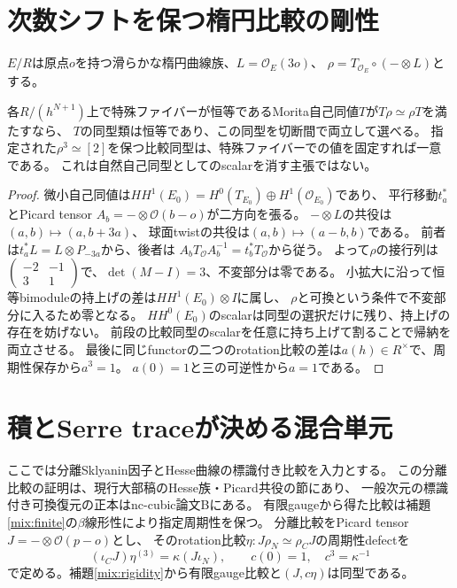 \section{次数シフトを保つ楕円比較の剛性}
$E/R$は原点$o$を持つ滑らかな楕円曲線族、$L=\mathcal O_E(3o)$、
$\rho=T_{\mathcal O_E}\circ(-\otimes L)$とする。
\begin{lemma}\label{mix:rigidity}
各$R/(h^{N+1})$上で特殊ファイバーが恒等であるMorita自己同値$T$が$T\rho\simeq\rho T$を満たすなら、
$T$の同型類は恒等であり、この同型を切断間で両立して選べる。
指定された$\rho^3\simeq[2]$を保つ比較同型は、特殊ファイバーでの値を固定すれば一意である。
これは自然自己同型としてのscalarを消す主張ではない。
\end{lemma}
\begin{proof}
微小自己同値は$HH^1(E_0)=H^0(T_{E_0})\oplus H^1(\mathcal O_{E_0})$であり、
平行移動$t_a^*$とPicard tensor $A_b=-\otimes\mathcal O(b-o)$が二方向を張る。
$-\otimes L$の共役は$(a,b)\mapsto(a,b+3a)$、
球面twistの共役は$(a,b)\mapsto(a-b,b)$である。
前者は$t_a^*L=L\otimes P_{-3a}$から、後者は
$A_bT_{\mathcal O}A_b^{-1}=t_b^*T_{\mathcal O}$から従う。
よって$\rho$の接行列は
$\left(\begin{smallmatrix}-2&-1\\3&1\end{smallmatrix}\right)$で、$\det(M-I)=3$、不変部分は零である。
小拡大に沿って恒等bimoduleの持上げの差は$HH^1(E_0)\otimes I$に属し、
$\rho$と可換という条件で不変部分に入るため零となる。
$HH^0(E_0)$のscalarは同型の選択だけに残り、持上げの存在を妨げない。
前段の比較同型のscalarを任意に持ち上げて割ることで帰納を両立させる。
最後に同じfunctorの二つのrotation比較の差は$a(h)\in R^\times$で、周期性保存から$a^3=1$。
$a(0)=1$と三の可逆性から$a=1$である。
\end{proof}

\section{積とSerre traceが決める混合単元}
ここでは分離Sklyanin因子とHesse曲線の標識付き比較\cite{Hesse,Reconstruction}を入力とする。
この分離比較の証明は、現行大部稿のHesse族・Picard共役の節にあり、
一般次元の標識付き可換復元の正本はnc-cubic論文Bにある。
有限gaugeから得た比較は補題\ref{mix:finite}の$\beta$線形性により指定周期性を保つ。
分離比較をPicard tensor $J=-\otimes\mathcal O(p-o)$とし、
そのrotation比較$\eta:J\rho_N\simeq\rho_CJ$の周期性defectを
\[
 (\iota_CJ)\eta^{(3)}=\kappa(J\iota_N),\qquad
 c(0)=1,\quad c^3=\kappa^{-1}
\]
で定める。補題\ref{mix:rigidity}から有限gauge比較と$(J,c\eta)$は同型である。

